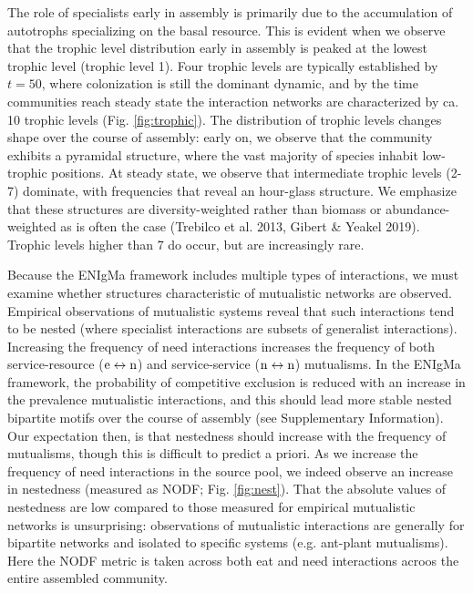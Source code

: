 \documentclass[twocolumn,preprintnumbers,amsmath,amssymb,superscriptaddress]{revtex4}
\newcommand{\rr}[1]{{\rm #1}}
\begin{document}
The role of specialists early in assembly is primarily due to the accumulation of autotrophs specializing on the basal resource.
This is evident when we observe that the trophic level distribution early in assembly is peaked at the lowest trophic level (trophic level 1).
Four trophic levels are typically established by $t=50$, where colonization is still the dominant dynamic, and by the time communities reach steady state the interaction networks are characterized by ca. 10 trophic levels (Fig. \ref{fig:trophic}).
The distribution of trophic levels changes shape over the course of assembly: early on, we observe that the community exhibits a pyramidal structure, where the vast majority of species inhabit low-trophic positions.
At steady state, we observe that intermediate trophic levels (2-7) dominate, with frequencies that reveal an hour-glass structure.
We emphasize that these structures are diversity-weighted rather than biomass or abundance-weighted as is often the case (Trebilco et al. 2013, Gibert \& Yeakel 2019).
Trophic levels higher than 7 do occur, but are increasingly rare.


Because the ENIgMa framework includes multiple types of interactions, we must examine whether structures characteristic of mutualistic networks are observed.
Empirical observations of mutualistic systems reveal that such interactions tend to be nested (where specialist interactions are subsets of generalist interactions).
Increasing the frequency of need interactions increases the frequency of both service-resource ($\rr{e}\leftrightarrow \rr{n}$) and service-service ($\rr{n} \leftrightarrow \rr{n}$) mutualisms.
In the ENIgMa framework, the probability of competitive exclusion is reduced with an increase in the prevalence mutualistic interactions, and this should lead more stable nested bipartite motifs over the course of assembly (see Supplementary Information).
Our expectation then, is that nestedness should increase with the frequency of mutualisms, though this is difficult to predict a priori.
As we increase the frequency of need interactions in the source pool, we indeed observe an increase in nestedness (measured as NODF; Fig. \ref{fig:nest}).
That the absolute values of nestedness are low compared to those measured for empirical mutualistic networks is unsurprising: observations of mutualistic interactions are generally for bipartite networks and isolated to specific systems (e.g. ant-plant mutualisms).
Here the NODF metric is taken across both eat and need interactions acroos the entire assembled community.
\end{document}
